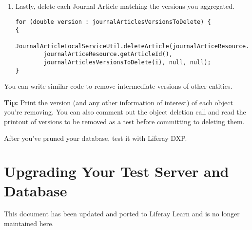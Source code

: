 \begin{enumerate}
\begin{verbatim}
List<Double> journalArticlesVersionsToDelete =
    new ArrayList<Double>();

for (int i=0; i < result.size(); i++) {
    long id = (long) result.get(i)[0];
    double version = (double) result.get(i)[1];
    int status = (int) result.get(i)[2];

    if ((status == WorkflowConstants.STATUS_APPROVED) || (status == WorkflowConstants.STATUS_EXPIRED) {

        if (i < MIN_NUMBER_FIRST_VERSIONS_KEPT) {
            continue;
        }

        if (i >= (result.size() -
            MIN_NUMBER_LATEST_VERSIONS_KEPT)) {
            continue;
        }

        journalArticlesVersionsToDelete.add(version);
    }
}

// See the next step for the sample code that goes here
\end{verbatim}
\item
  Lastly, delete each Journal Article matching the versions you
  aggregated.

\begin{verbatim}
for (double version : journalArticlesVersionsToDelete) {
{
    JournalArticleLocalServiceUtil.deleteArticle(journalArticeResource.getGroupId(),
        journalArticeResource.getArticleId(), 
        journalArticlesVersionsToDelete(i), null, null);
}
\end{verbatim}
\end{enumerate}

You can write similar code to remove intermediate versions of other
entities.

\noindent\hrulefill

\textbf{Tip:} Print the version (and any other information of interest)
of each object you're removing. You can also comment out the object
deletion call and read the printout of versions to be removed as a test
before committing to deleting them.

\noindent\hrulefill

After you've pruned your database, test it with Liferay DXP.

\chapter{Upgrading Your Test Server and
Database}\label{upgrading-your-test-server-and-database}

{This document has been updated and ported to Liferay Learn and is no
longer maintained here.}

